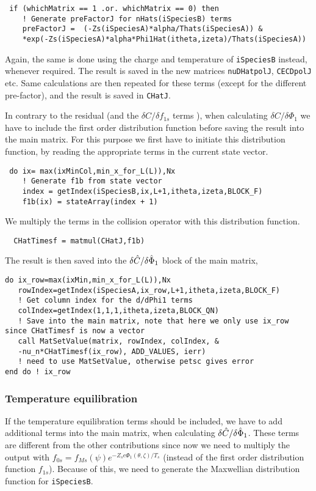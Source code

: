 \documentclass[12pt]{article}
\begin{document}
\begin{lstlisting}
 if (whichMatrix == 1 .or. whichMatrix == 0) then
    ! Generate preFactorJ for nHats(iSpeciesB) terms              
    preFactorJ =  (-Zs(iSpeciesA)*alpha/Thats(iSpeciesA)) &
    *exp(-Zs(iSpeciesA)*alpha*Phi1Hat(itheta,izeta)/Thats(iSpeciesA))
\end{lstlisting}

\noindent
Again, the same is done using the charge and temperature of \texttt{iSpeciesB} instead, whenever required. 
The result is saved in the new matrices \texttt{nuDHatpolJ}, \texttt{CECDpolJ} etc. Same calculations are then repeated for these terms (except for the different pre-factor), and the result is saved in \texttt{CHatJ}. 

In contrary to the residual (and the $\delta C/\delta f_{1s}$ terms ), when calculating $\delta C/\delta \Phi_1$ we have to include the first order distribution function before saving the result into the main matrix. For this purpose we first have to initiate this distribution function, by reading the appropriate terms in the current state vector. 

\begin{lstlisting}
 do ix= max(ixMinCol,min_x_for_L(L)),Nx
    ! Generate f1b from state vector
    index = getIndex(iSpeciesB,ix,L+1,itheta,izeta,BLOCK_F) 
    f1b(ix) = stateArray(index + 1)
\end{lstlisting}

\noindent
We multiply the terms in the collision operator with this distribution function.

 \begin{lstlisting}
  CHatTimesf = matmul(CHatJ,f1b)
 \end{lstlisting}
\noindent
The result is then saved into the $\delta \Hat C/\delta \hat \Phi_1$ block of the main matrix,

 \begin{lstlisting}
do ix_row=max(ixMin,min_x_for_L(L)),Nx
   rowIndex=getIndex(iSpeciesA,ix_row,L+1,itheta,izeta,BLOCK_F)
   ! Get column index for the d/dPhi1 terms
   colIndex=getIndex(1,1,1,itheta,izeta,BLOCK_QN)
   ! Save into the main matrix, note that here we only use ix_row since CHatTimesf is now a vector
   call MatSetValue(matrix, rowIndex, colIndex, & 
   -nu_n*CHatTimesf(ix_row), ADD_VALUES, ierr) 
   ! need to use MatSetValue, otherwise petsc gives error
end do ! ix_row
\end{lstlisting}
\noindent

\subsubsection*{Temperature equilibration}
\label{sec:Jac2}
If the temperature equilibration terms should be included, we have to add additional terms into the main matrix, when calculating  $\delta \Hat C/\delta \hat \Phi_1$. These terms are different from the other contributions since now we need to multiply the output with $f_{0s} = f_{Ms}(\psi)e^{-Z_se\Phi_1(\theta,\zeta)/T_s}$ (instead of the first order distribution function $f_{1s}$). Because of this, we need to generate the Maxwellian distribution function for \texttt{iSpeciesB}.
\end{document}
